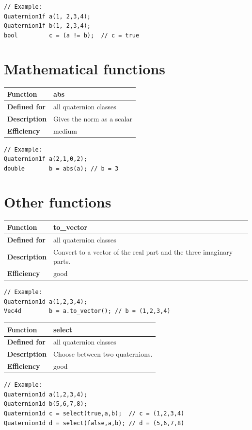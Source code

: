\documentclass[11pt,a4paper,oneside,openright]{report}
\newcommand{\vspacesmall}{\vspace{3mm}}
\newcommand{\vspacebig}{\vspace{6mm}}
\begin{document}
\begin{lstlisting}[frame=none]
// Example:
Quaternion1f a(1, 2,3,4);
Quaternion1f b(1,-2,3,4);
bool         c = (a != b);  // c = true
\end{lstlisting}
\vspacebig


\chapter{Mathematical functions}\label{chap:MathematicalFunctions}


\begin{tabular}{|p{25mm}|p{100mm}|}
\hline
\bfseries Function & abs \\ \hline
\bfseries Defined for & all quaternion classes  \\ \hline
\bfseries Description & Gives the norm as a scalar \\ \hline
\bfseries Efficiency & medium \\ \hline
\end{tabular}
\vspacesmall

\begin{lstlisting}[frame=none]
// Example:
Quaternion1f a(2,1,0,2);
double       b = abs(a); // b = 3
\end{lstlisting}
\vspacebig



\chapter{Other functions}\label{chap:OtherFunctions}


\begin{tabular}{|p{25mm}|p{100mm}|}
\hline
\bfseries Function & to\_vector \\ \hline
\bfseries Defined for & all quaternion classes \\ \hline
\bfseries Description & Convert to a vector of the real part and the three imaginary parts. \\ \hline
\bfseries Efficiency & good \\ \hline
\end{tabular}
\vspacesmall

\begin{lstlisting}[frame=none]
// Example:
Quaternion1d a(1,2,3,4);
Vec4d        b = a.to_vector(); // b = (1,2,3,4)
\end{lstlisting}
\vspacebig


\begin{tabular}{|p{25mm}|p{100mm}|}
\hline
\bfseries Function & select \\ \hline
\bfseries Defined for & all quaternion classes  \\ \hline
\bfseries Description & Choose between two quaternions. \\ \hline
\bfseries Efficiency & good \\ \hline
\end{tabular}
\vspacesmall

\begin{lstlisting}[frame=none]
// Example:
Quaternion1d a(1,2,3,4);
Quaternion1d b(5,6,7,8);
Quaternion1d c = select(true,a,b);  // c = (1,2,3,4)
Quaternion1d d = select(false,a,b); // d = (5,6,7,8)
\end{lstlisting}
\vspacebig
\end{document}
